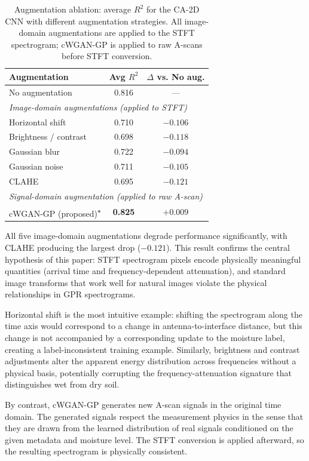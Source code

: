 \documentclass[review]{elsarticle}
\begin{document}
\begin{table}[htbp]
\centering
\caption{Augmentation ablation: average $R^2$ for the CA-2D CNN with different augmentation strategies. All image-domain augmentations are applied to the STFT spectrogram; cWGAN-GP is applied to raw A-scans before STFT conversion.}
\label{tab:aug_ablation}
\begin{tabular}{lcc}
\toprule
Augmentation & Avg $R^2$ & $\Delta$ vs. No aug. \\
\midrule
No augmentation              & 0.816 & --- \\
\midrule
\multicolumn{3}{l}{\textit{Image-domain augmentations (applied to STFT)}} \\
Horizontal shift             & 0.710 & $-0.106$ \\
Brightness / contrast        & 0.698 & $-0.118$ \\
Gaussian blur                & 0.722 & $-0.094$ \\
Gaussian noise               & 0.711 & $-0.105$ \\
CLAHE                        & 0.695 & $-0.121$ \\
\midrule
\multicolumn{3}{l}{\textit{Signal-domain augmentation (applied to raw A-scan)}} \\
cWGAN-GP (proposed)\textsuperscript{$\star$} & \textbf{0.825} & $+0.009$ \\
\bottomrule
\end{tabular}
\end{table}

All five image-domain augmentations degrade performance significantly, with CLAHE producing the largest drop ($-0.121$). This result confirms the central hypothesis of this paper: STFT spectrogram pixels encode physically meaningful quantities (arrival time and frequency-dependent attenuation), and standard image transforms that work well for natural images violate the physical relationships in GPR spectrograms.

Horizontal shift is the most intuitive example: shifting the spectrogram along the time axis would correspond to a change in antenna-to-interface distance, but this change is not accompanied by a corresponding update to the moisture label, creating a label-inconsistent training example. Similarly, brightness and contrast adjustments alter the apparent energy distribution across frequencies without a physical basis, potentially corrupting the frequency-attenuation signature that distinguishes wet from dry soil.

By contrast, cWGAN-GP generates new A-scan signals in the original time domain. The generated signals respect the measurement physics in the sense that they are drawn from the learned distribution of real signals conditioned on the given metadata and moisture level. The STFT conversion is applied afterward, so the resulting spectrogram is physically consistent.
\end{document}
